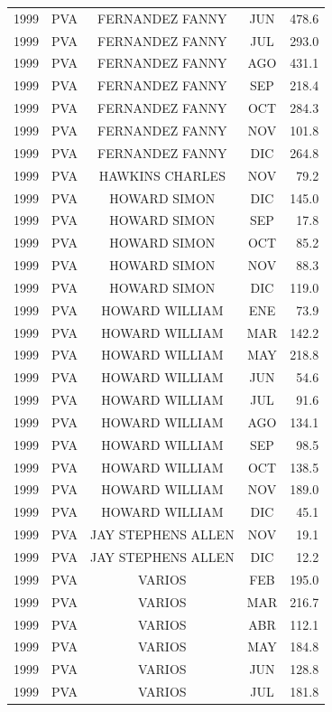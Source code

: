 \documentclass[12pt,]{article}
\begin{document}
\begin{table}[ht]
{\begin{tabular}{lcccr}
  1999 & PVA & FERNANDEZ FANNY & JUN & 478.6 \\ 
  1999 & PVA & FERNANDEZ FANNY & JUL & 293.0 \\ 
  1999 & PVA & FERNANDEZ FANNY & AGO & 431.1 \\ 
  1999 & PVA & FERNANDEZ FANNY & SEP & 218.4 \\ 
  1999 & PVA & FERNANDEZ FANNY & OCT & 284.3 \\ 
  1999 & PVA & FERNANDEZ FANNY & NOV & 101.8 \\ 
  1999 & PVA & FERNANDEZ FANNY & DIC & 264.8 \\ 
  1999 & PVA & HAWKINS CHARLES & NOV & 79.2 \\ 
  1999 & PVA & HOWARD SIMON & DIC & 145.0 \\ 
  1999 & PVA & HOWARD SIMON & SEP & 17.8 \\ 
  1999 & PVA & HOWARD SIMON & OCT & 85.2 \\ 
  1999 & PVA & HOWARD SIMON & NOV & 88.3 \\ 
  1999 & PVA & HOWARD SIMON & DIC & 119.0 \\ 
  1999 & PVA & HOWARD WILLIAM & ENE & 73.9 \\ 
  1999 & PVA & HOWARD WILLIAM & MAR & 142.2 \\ 
  1999 & PVA & HOWARD WILLIAM & MAY & 218.8 \\ 
  1999 & PVA & HOWARD WILLIAM & JUN & 54.6 \\ 
  1999 & PVA & HOWARD WILLIAM & JUL & 91.6 \\ 
  1999 & PVA & HOWARD WILLIAM & AGO & 134.1 \\ 
  1999 & PVA & HOWARD WILLIAM & SEP & 98.5 \\ 
  1999 & PVA & HOWARD WILLIAM & OCT & 138.5 \\ 
  1999 & PVA & HOWARD WILLIAM & NOV & 189.0 \\ 
  1999 & PVA & HOWARD WILLIAM & DIC & 45.1 \\ 
  1999 & PVA & JAY STEPHENS ALLEN & NOV & 19.1 \\ 
  1999 & PVA & JAY STEPHENS ALLEN & DIC & 12.2 \\ 
  1999 & PVA & VARIOS & FEB & 195.0 \\ 
  1999 & PVA & VARIOS & MAR & 216.7 \\ 
  1999 & PVA & VARIOS & ABR & 112.1 \\ 
  1999 & PVA & VARIOS & MAY & 184.8 \\ 
  1999 & PVA & VARIOS & JUN & 128.8 \\ 
  1999 & PVA & VARIOS & JUL & 181.8 \\ 

\end{tabular}}
\end{table}
\end{document}
